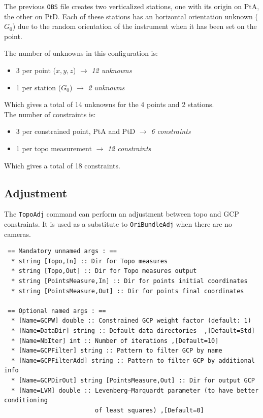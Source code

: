 The previous \texttt{OBS} file creates two verticalized stations, one with its origin on PtA, the other on PtD.
Each of these stations has an horizontal orientation unknown ($G_0$) due to the random orientation of the instrument
when it has been set on the point.

The number of unknowns in this configuration is:
\begin{itemize}
   \item 3 per point ($x, y, z$)  $\rightarrow$ \textit{12 unknowns}
   \item 1 per station ($G_0$)  $\rightarrow$ \textit{2 unknowns}
\end{itemize}

Which gives a total of 14 unknowns for the 4 points and 2 stations.
\\

The number of constraints is:
\begin{itemize}
   \item 3 per constrained point, PtA and PtD  $\rightarrow$ \textit{6 constraints}
   \item 1 per topo measurement $\rightarrow$ \textit{12 constraints}
\end{itemize}

Which gives a total of 18 constraints.


\subsection{Adjustment}
\label{subsec:TopoAdj}
The \texttt{TopoAdj} command can perform an adjustment between topo and GCP constraints.
It is used as a substitute to \texttt{OriBundleAdj} when there are no cameras.

\begin{verbatim}
 == Mandatory unnamed args : ==
  * string [Topo,In] :: Dir for Topo measures
  * string [Topo,Out] :: Dir for Topo measures output
  * string [PointsMeasure,In] :: Dir for points initial coordinates
  * string [PointsMeasure,Out] :: Dir for points final coordinates

 == Optional named args : ==
  * [Name=GCPW] double :: Constrained GCP weight factor (default: 1)
  * [Name=DataDir] string :: Default data directories  ,[Default=Std]
  * [Name=NbIter] int :: Number of iterations ,[Default=10]
  * [Name=GCPFilter] string :: Pattern to filter GCP by name
  * [Name=GCPFilterAdd] string :: Pattern to filter GCP by additional info
  * [Name=GCPDirOut] string [PointsMeasure,Out] :: Dir for output GCP
  * [Name=LVM] double :: Levenberg–Marquardt parameter (to have better conditioning
                         of least squares) ,[Default=0]
\end{verbatim}

